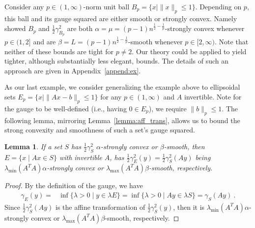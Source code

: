 \documentclass[sn-mathphys,Numbered]{sn-jnl}%
\newtheorem{lemma}[theorem]{Lemma}%
\begin{document}
 Consider any $p\in(1,\infty)$-norm unit ball $B_p =\{x \mid \|x\|_p \leq 1\}$. Depending on $p$, this ball and its gauge squared are either smooth or strongly convex. Namely~\cite[Lemma 4]{garber2015faster} showed $B_p$ and $\frac{1}{2}\gamma_{B_p}^2$ are both $\alpha=\mu=(p-1)n^{\frac{1}{2}-\frac{1}{p}}$-strongly convex whenever $p\in(1,2]$ and are $\beta=L=(p-1)n^{\frac{1}{2}-\frac{1}{p}}$-smooth whenever $p\in[2,\infty)$. Note that neither of these bounds are tight for $p\neq 2$. Our theory could be applied to yield tighter, although substantially less elegant, bounds. The details of such an approach are given in Appendix~\ref{append:ex}. %


 As our last example, we consider generalizing the example above to ellipsoidal sets $E_p = \{x \mid \|Ax-b\|_p \leq 1\}$ for any $p\in (1,\infty)$ and $A$ invertible. Note for the gauge to be well-defined (i.e., having $0\in E_p$), we require $\|b\|_p \leq 1$.
The following lemma, mirroring Lemma~\ref{lemma:aff_trans}, allows us to bound the strong convexity and smoothness of such a set's gauge squared.

\begin{lemma} \label{lem:struc_trans}
If a set $S$ has $\frac{1}{2}\gamma_S^2$ $\alpha$-strongly convex or $\beta$-smooth, then $E = \{x \mid Ax \in S\}$ with invertible $A$, has $\frac{1}{2}\gamma^2_E(y)=\frac{1}{2}\gamma^2_S(Ay)$ being $\lambda_{\min}(A^TA)\alpha$-strongly convex or $\lambda_{\max}(A^TA)\beta$-smooth, respectively.
\end{lemma}

\begin{proof}
    By the definition of the gauge, we have
\begin{align*}
\gamma_E(y) =& \inf\{\lambda>0 \mid y \in \lambda E\} 
=\inf \{\lambda>0 \mid Ay \in \lambda S\}=\gamma_S(Ay) \ . 
\end{align*}    
Since $\frac{1}{2}\gamma_S^2(Ay)$ is the affine transformation of $\frac{1}{2}\gamma_S^2(y)$, then it is $\lambda_{\min}(A^TA)\alpha$-strongly convex or $\lambda_{\max}(A^TA)\beta$-smooth, respectively.
\end{proof}
\end{document}
